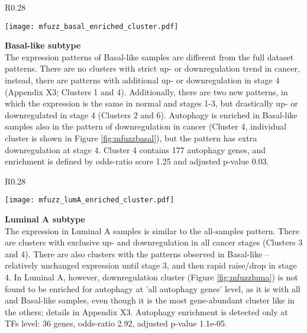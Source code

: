         
        \begin{wrapfigure}{R}{0.28\textwidth}
        \hfill
        \captionsetup{justification=centering}
        \centerline{ \texttt{[image: mfuzz\_basal\_enriched\_cluster.pdf]}}
        \vspace*{-8mm}
        \caption{\label{fig:mfuzzbasal}Basal-like\newline downregulation cluster}
        \end{wrapfigure}

        
        \textbf{Basal-like subtype}\\
        The expression patterns of Basal-like samples are different from the full dataset patterns. There are no clusters with strict up- or downregulation trend in cancer, instead, there are patterns with additional up- or downregulation in stage 4 (Appendix X3; Clusters 1 and 4). Additionally, there are two new patterns, in which the expression is the same in normal and stages 1-3, but drastically up- or downregulated in stage 4 (Clusters 2 and 6).  
        Autophagy is enriched in Basal-like samples also in the pattern of downregulation in cancer (Cluster 4, individual cluster is shown in Figure \ref{fig:mfuzzbasal}), but the pattern has extra downregulation at stage 4. Cluster 4 contains 177 autophagy genes, and enrichment is defined by odds-ratio score 1.25 and adjusted p-value 0.03. 
        
        
        \begin{wrapfigure}{R}{0.28\textwidth}
        \hfill
        \captionsetup{justification=centering}
        \centerline{ \texttt{[image: mfuzz\_lumA\_enriched\_cluster.pdf]}}
        \vspace*{-8mm}
        \caption{\label{fig:mfuzzluma}Luminal A \newline downregulation cluster}
        \end{wrapfigure}
        
        
        \textbf{Luminal A subtype}\\   
        The expression in Luminal A samples is similar to the all-samples pattern. There are clusters with exclusive up- and downregulation in all cancer stages (Clusters 3 and 4). There are also clusters with the patterns observed in Basal-like -- relatively unchanged expression until stage 3, and then rapid raise/drop in stage 4. In Luminal A, however, downregulation cluster (Figure \ref{fig:mfuzzluma}) is not found to be enriched for autophagy at 'all autophagy genes' level, as it is with all and Basal-like samples, even though it is the most gene-abundant cluster like in the others; details in Appendix X3. Autophagy enrichment is detected only at TFs level: 36 genes, odds-ratio 2.92, adjusted p-value 1.1e-05.\vspace{-5mm} \break
        
